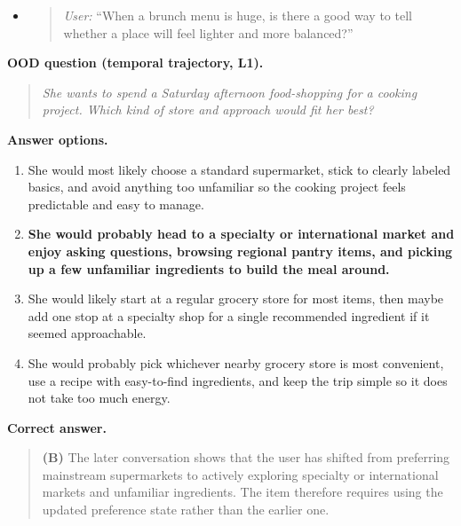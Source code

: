 \documentclass{llmxive}
\begin{document}
\begin{tcolorbox}
\begin{itemize}[leftmargin=1.5em]
    \item
    \begin{quote}
    \textit{User:} ``When a brunch menu is huge, is there a good way to tell whether a place will feel lighter and more balanced?''
    \end{quote}
\end{itemize}

\vspace{0.5em}
\textbf{OOD question (temporal trajectory, L1).}

\begin{quote}
\textit{She wants to spend a Saturday afternoon food-shopping for a cooking project. Which kind of store and approach would fit her best?}
\end{quote}

\textbf{Answer options.}
\begin{enumerate}[label=(\Alph*), leftmargin=2em]
    \item She would most likely choose a standard supermarket, stick to clearly labeled basics, and avoid anything too unfamiliar so the cooking project feels predictable and easy to manage.
    \item \textbf{She would probably head to a specialty or international market and enjoy asking questions, browsing regional pantry items, and picking up a few unfamiliar ingredients to build the meal around.}
    \item She would likely start at a regular grocery store for most items, then maybe add one stop at a specialty shop for a single recommended ingredient if it seemed approachable.
    \item She would probably pick whichever nearby grocery store is most convenient, use a recipe with easy-to-find ingredients, and keep the trip simple so it does not take too much energy.
\end{enumerate}

\textbf{Correct answer.}
\begin{quote}
\textbf{(B)} The later conversation shows that the user has shifted from preferring mainstream supermarkets to actively exploring specialty or international markets and unfamiliar ingredients. The item therefore requires using the updated preference state rather than the earlier one.
\end{quote}

\end{tcolorbox}























% 
\end{document}
